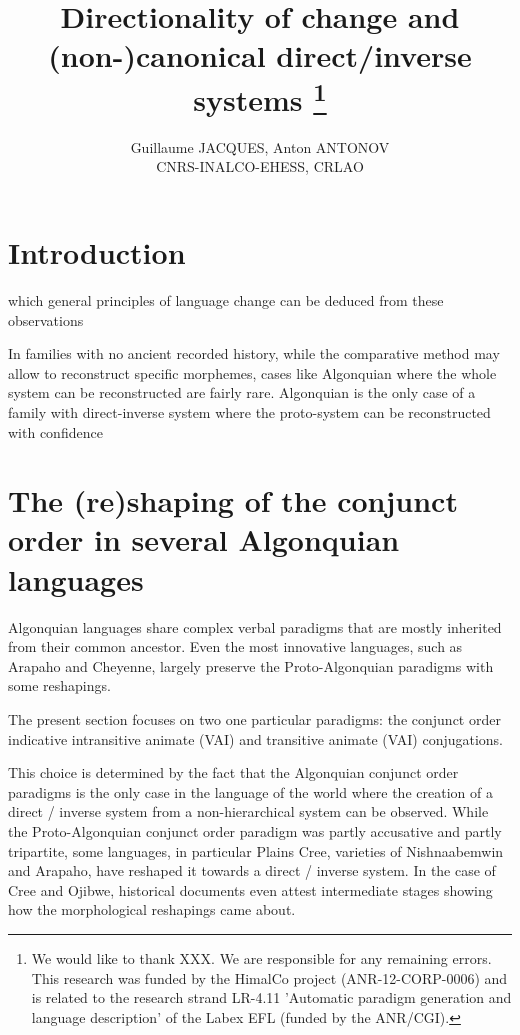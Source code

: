 \documentclass[twoside,a4paper,11pt]{article}
\newcommand{\Σ}{\greek{Σ}}
\begin{document}
\linenumbers
\title{Directionality of change and   (non-)canonical direct/inverse systems \footnote{We would like to thank XXX. We are responsible for any remaining errors. This research was funded by the HimalCo project (ANR-12-CORP-0006) and is related to the research strand LR-4.11 'Automatic paradigm generation and language description' of the Labex EFL (funded by the ANR/CGI). } }

\author{Guillaume JACQUES, Anton ANTONOV\\ CNRS-INALCO-EHESS, CRLAO}
\maketitle
\section{Introduction}

which general principles of language change can be deduced from these observations


In families with no ancient recorded history, while the comparative method may allow to reconstruct specific morphemes, cases like Algonquian where the whole system can be reconstructed are fairly rare. Algonquian is the only case of a family with direct-inverse system where the proto-system can be reconstructed with confidence

\section{The (re)shaping of the conjunct order in several Algonquian languages }
Algonquian languages share complex verbal paradigms that are mostly inherited from their common ancestor. Even the most innovative languages, such as Arapaho and Cheyenne, largely preserve the Proto-Algonquian paradigms with some reshapings.

The present section focuses on two one particular paradigms: the conjunct order indicative intransitive animate (VAI) and transitive animate (VAI) conjugations. 

This choice is determined by the fact that the Algonquian conjunct order paradigms is the only case in the language of the world where the creation of a direct / inverse system from a non-hierarchical   system can be observed. While the Proto-Algonquian conjunct order paradigm was partly accusative and partly tripartite, some languages, in particular Plains Cree, varieties of Nishnaabemwin and Arapaho, have reshaped it towards a direct / inverse system. In the case of Cree and Ojibwe, historical documents even attest intermediate stages showing how the morphological reshapings came about.
\end{document}
